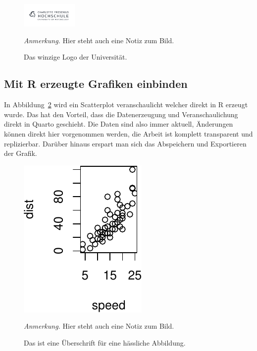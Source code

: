 \documentclass[
  stu,
  floatsintext,
  longtable,
  a4paper,
  nolmodern,
  notxfonts,
  notimes,
  donotrepeattitle,
  colorlinks=true,linkcolor=blue,citecolor=blue,urlcolor=blue]{apa7}
\begin{document}
\begin{figure}[t]

{\caption{{Das winzige Logo der Universität.}{\label{fig-logo3}}}}

\includegraphics[width=1.07in,height=\textheight]{logo.png}

{\noindent \emph{Anmerkung.} Hier steht auch eine Notiz zum Bild.}

\end{figure}

\subsection{Mit R erzeugte Grafiken
einbinden}\label{mit-r-erzeugte-grafiken-einbinden}

In Abbildung~\ref{fig-plotcar} wird ein Scatterplot veranschaulicht
welcher direkt in R erzeugt wurde. Das hat den Vorteil, dass die
Datenerzeugung und Veranschaulichung direkt in Quarto geschieht. Die
Daten sind also immer aktuell, Änderungen können direkt hier vorgenommen
werden, die Arbeit ist komplett transparent und replizierbar. Darüber
hinaus erspart man sich das Abspeichern und Exportieren der Grafik.

\begin{figure}[t]

{\caption{{Das ist eine Überschrift für eine hässliche
Abbildung.}{\label{fig-plotcar}}}}

\includegraphics{roadshow_apa_de_files/figure-pdf/fig-plotcar-1.pdf}

{\noindent \emph{Anmerkung.} Hier steht auch eine Notiz zum Bild.}

\end{figure}
\end{document}

